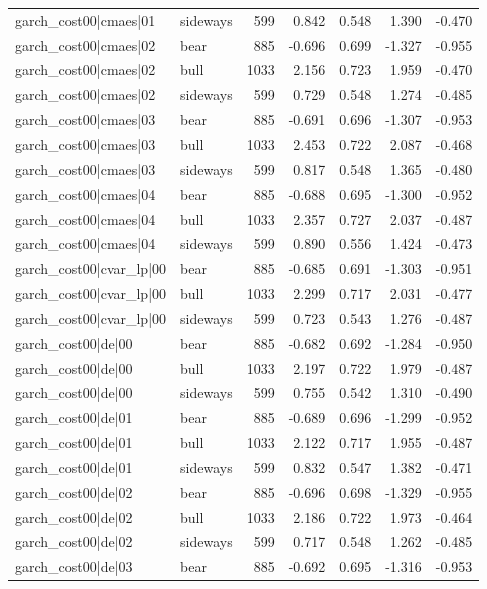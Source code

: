 \begin{table}
\begin{tabular}{llrrrrr}
garch\_cost00|cmaes|01 & sideways & 599 & 0.842 & 0.548 & 1.390 & -0.470 \\
garch\_cost00|cmaes|02 & bear & 885 & -0.696 & 0.699 & -1.327 & -0.955 \\
garch\_cost00|cmaes|02 & bull & 1033 & 2.156 & 0.723 & 1.959 & -0.470 \\
garch\_cost00|cmaes|02 & sideways & 599 & 0.729 & 0.548 & 1.274 & -0.485 \\
garch\_cost00|cmaes|03 & bear & 885 & -0.691 & 0.696 & -1.307 & -0.953 \\
garch\_cost00|cmaes|03 & bull & 1033 & 2.453 & 0.722 & 2.087 & -0.468 \\
garch\_cost00|cmaes|03 & sideways & 599 & 0.817 & 0.548 & 1.365 & -0.480 \\
garch\_cost00|cmaes|04 & bear & 885 & -0.688 & 0.695 & -1.300 & -0.952 \\
garch\_cost00|cmaes|04 & bull & 1033 & 2.357 & 0.727 & 2.037 & -0.487 \\
garch\_cost00|cmaes|04 & sideways & 599 & 0.890 & 0.556 & 1.424 & -0.473 \\
garch\_cost00|cvar\_lp|00 & bear & 885 & -0.685 & 0.691 & -1.303 & -0.951 \\
garch\_cost00|cvar\_lp|00 & bull & 1033 & 2.299 & 0.717 & 2.031 & -0.477 \\
garch\_cost00|cvar\_lp|00 & sideways & 599 & 0.723 & 0.543 & 1.276 & -0.487 \\
garch\_cost00|de|00 & bear & 885 & -0.682 & 0.692 & -1.284 & -0.950 \\
garch\_cost00|de|00 & bull & 1033 & 2.197 & 0.722 & 1.979 & -0.487 \\
garch\_cost00|de|00 & sideways & 599 & 0.755 & 0.542 & 1.310 & -0.490 \\
garch\_cost00|de|01 & bear & 885 & -0.689 & 0.696 & -1.299 & -0.952 \\
garch\_cost00|de|01 & bull & 1033 & 2.122 & 0.717 & 1.955 & -0.487 \\
garch\_cost00|de|01 & sideways & 599 & 0.832 & 0.547 & 1.382 & -0.471 \\
garch\_cost00|de|02 & bear & 885 & -0.696 & 0.698 & -1.329 & -0.955 \\
garch\_cost00|de|02 & bull & 1033 & 2.186 & 0.722 & 1.973 & -0.464 \\
garch\_cost00|de|02 & sideways & 599 & 0.717 & 0.548 & 1.262 & -0.485 \\
garch\_cost00|de|03 & bear & 885 & -0.692 & 0.695 & -1.316 & -0.953 \\

\end{tabular}
\end{table}
